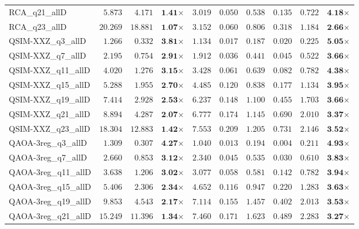 \begin{table*}[t]
{\begin{tabular}{| l || r r c || r r r r r c |}
RCA\_q21\_allD & $5.873$ & $4.171$ & $\textbf{1.41}$$\times$ & $3.019$ & $0.050$ & $0.538$ & $0.135$ & $0.722$ & $\textbf{4.18}$$\times$ \\
RCA\_q23\_allD & $20.269$ & $18.881$ & $\textbf{1.07}$$\times$ & $3.152$ & $0.060$ & $0.806$ & $0.318$ & $1.184$ & $\textbf{2.66}$$\times$ \\
QSIM-XXZ\_q3\_allD & $1.266$ & $0.332$ & $\textbf{3.81}$$\times$ & $1.134$ & $0.017$ & $0.187$ & $0.020$ & $0.225$ & $\textbf{5.05}$$\times$ \\
QSIM-XXZ\_q7\_allD & $2.195$ & $0.754$ & $\textbf{2.91}$$\times$ & $1.912$ & $0.036$ & $0.441$ & $0.045$ & $0.522$ & $\textbf{3.66}$$\times$ \\
QSIM-XXZ\_q11\_allD & $4.020$ & $1.276$ & $\textbf{3.15}$$\times$ & $3.428$ & $0.061$ & $0.639$ & $0.082$ & $0.782$ & $\textbf{4.38}$$\times$ \\
QSIM-XXZ\_q15\_allD & $5.288$ & $1.955$ & $\textbf{2.70}$$\times$ & $4.485$ & $0.120$ & $0.838$ & $0.177$ & $1.134$ & $\textbf{3.95}$$\times$ \\
QSIM-XXZ\_q19\_allD & $7.414$ & $2.928$ & $\textbf{2.53}$$\times$ & $6.237$ & $0.148$ & $1.100$ & $0.455$ & $1.703$ & $\textbf{3.66}$$\times$ \\
QSIM-XXZ\_q21\_allD & $8.894$ & $4.287$ & $\textbf{2.07}$$\times$ & $6.777$ & $0.174$ & $1.145$ & $0.690$ & $2.010$ & $\textbf{3.37}$$\times$ \\
QSIM-XXZ\_q23\_allD & $18.304$ & $12.883$ & $\textbf{1.42}$$\times$ & $7.553$ & $0.209$ & $1.205$ & $0.731$ & $2.146$ & $\textbf{3.52}$$\times$ \\
QAOA-3reg\_q3\_allD & $1.309$ & $0.307$ & $\textbf{4.27}$$\times$ & $1.040$ & $0.013$ & $0.194$ & $0.004$ & $0.211$ & $\textbf{4.93}$$\times$ \\
QAOA-3reg\_q7\_allD & $2.660$ & $0.853$ & $\textbf{3.12}$$\times$ & $2.340$ & $0.045$ & $0.535$ & $0.030$ & $0.610$ & $\textbf{3.83}$$\times$ \\
QAOA-3reg\_q11\_allD & $3.638$ & $1.206$ & $\textbf{3.02}$$\times$ & $3.077$ & $0.058$ & $0.581$ & $0.142$ & $0.782$ & $\textbf{3.94}$$\times$ \\
QAOA-3reg\_q15\_allD & $5.406$ & $2.306$ & $\textbf{2.34}$$\times$ & $4.652$ & $0.116$ & $0.947$ & $0.220$ & $1.283$ & $\textbf{3.63}$$\times$ \\
QAOA-3reg\_q19\_allD & $9.853$ & $4.543$ & $\textbf{2.17}$$\times$ & $7.114$ & $0.155$ & $1.457$ & $0.402$ & $2.013$ & $\textbf{3.53}$$\times$ \\
QAOA-3reg\_q21\_allD & $15.249$ & $11.396$ & $\textbf{1.34}$$\times$ & $7.460$ & $0.171$ & $1.623$ & $0.489$ & $2.283$ & $\textbf{3.27}$$\times$ \\

\end{tabular}}
\end{table*}
